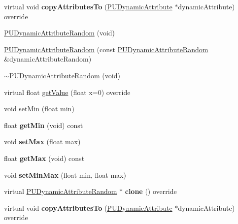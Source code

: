\begin{DoxyCompactItemize}
virtual void {\bfseries copy\+Attributes\+To} (\hyperlink{classPUDynamicAttribute}{P\+U\+Dynamic\+Attribute} $\ast$dynamic\+Attribute) override
\item 
\hyperlink{classPUDynamicAttributeRandom_aa9330b573f4e1f1a042f4e644996a6cd}{P\+U\+Dynamic\+Attribute\+Random} (void)
\item 
\hyperlink{classPUDynamicAttributeRandom_a1e1372992de014c69753fc2ab26adb2c}{P\+U\+Dynamic\+Attribute\+Random} (const \hyperlink{classPUDynamicAttributeRandom}{P\+U\+Dynamic\+Attribute\+Random} \&dynamic\+Attribute\+Random)
\item 
\hyperlink{classPUDynamicAttributeRandom_a438343056409091b7304d9983f4d62cf}{$\sim$\+P\+U\+Dynamic\+Attribute\+Random} (void)
\item 
virtual float \hyperlink{classPUDynamicAttributeRandom_a1b96f087b10c1128f39fb4cc5f25111f}{get\+Value} (float x=0) override
\item 
void \hyperlink{classPUDynamicAttributeRandom_a01a86b476cd6053523fccdedc7605519}{set\+Min} (float min)
\item 
\mbox{\label{classPUDynamicAttributeRandom_ad64cb7964c9724b6d914397a0ad89990}} 
float {\bfseries get\+Min} (void) const
\item 
\mbox{\label{classPUDynamicAttributeRandom_a92d9ce3f8a864c9c81c51f3f85d5f833}} 
void {\bfseries set\+Max} (float max)
\item 
\mbox{\label{classPUDynamicAttributeRandom_a8c2f70bd354095f438fba905d289570c}} 
float {\bfseries get\+Max} (void) const
\item 
\mbox{\label{classPUDynamicAttributeRandom_aee94887bbb2af2b9cd7cd7cb44e510ca}} 
void {\bfseries set\+Min\+Max} (float min, float max)
\item 
\mbox{\label{classPUDynamicAttributeRandom_af723326391f0816e302c675cc9bd01c2}} 
virtual \hyperlink{classPUDynamicAttributeRandom}{P\+U\+Dynamic\+Attribute\+Random} $\ast$ {\bfseries clone} () override
\item 
\mbox{\label{classPUDynamicAttributeRandom_a1f8cd560c7deb7c2b44437a77d6a1507}} 
virtual void {\bfseries copy\+Attributes\+To} (\hyperlink{classPUDynamicAttribute}{P\+U\+Dynamic\+Attribute} $\ast$dynamic\+Attribute) override
\end{DoxyCompactItemize}
